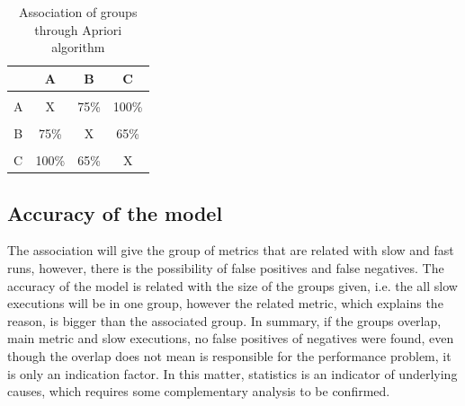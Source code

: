 \begin{table}[h]
\centering
\begin{tabular}{cccc}
                      & A                         & B                        & C     \\ \hline
                      &                           &                          &       \\ 
A                     & X                         & 75\%                     & 100\% \\ \hline
                      &                           &                          &       \\ 
B                     & 75\%                      & X                        & 65\%  \\ \hline
                      &                           &                          &       \\
\multicolumn{1}{l}{C} & \multicolumn{1}{l}{100\%} & \multicolumn{1}{l}{65\%} & X     \\ \hline
\end{tabular}
\vspace{10pt}
\caption{Association of groups through Apriori algorithm}
\label{fig:association}
\end{table}

\subsection{\textbf{Accuracy of the model}}
The association will give the group of metrics that are related with slow and fast runs, however, there is the possibility of false positives and false negatives. The accuracy of the model is related with the size of the groups given, i.e. the all slow executions will be in one group, however the related metric, which explains the reason, is bigger than the associated group.  In summary, if the groups overlap, main metric and slow executions, no false positives of negatives were found, even though the overlap does not mean is responsible for the performance problem, it is only an indication factor. In this matter, statistics is an indicator of underlying causes, which requires some complementary analysis to be confirmed.
